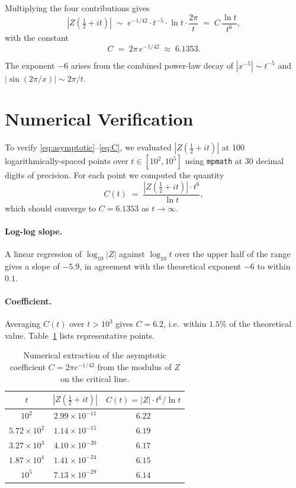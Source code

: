 \documentclass[11pt,a4paper]{article}
\begin{document}
Multiplying the four contributions gives
\begin{equation}
|Z(\tfrac12+it)|
\;\sim\; e^{-1/42}\cdot t^{-5}\cdot \ln t \cdot \frac{2\pi}{t}
\;=\; C\,\frac{\ln t}{t^{6}},
\label{eq:asymptotic}
\end{equation}
with the constant
\begin{equation}
\boxed{\; C \;=\; 2\pi\,e^{-1/42} \;\approx\; 6.1353. \;}
\label{eq:C}
\end{equation}

The exponent $-6$ arises from the combined power-law decay of
$|x^{-5}| \sim t^{-5}$ and $|\sin(2\pi/x)| \sim 2\pi/t$.

\section{Numerical Verification}

To verify \eqref{eq:asymptotic}--\eqref{eq:C}, we evaluated
$|Z(\tfrac12+it)|$ at 100 logarithmically-spaced points over
$t\in[10^{2},10^{5}]$ using \texttt{mpmath} at 30 decimal digits
of precision. For each point we computed the quantity
\[
C(t) \;=\; \frac{|Z(\tfrac12+it)|\cdot t^{6}}{\ln t},
\]
which should converge to $C = 6.1353$ as $t\to\infty$.

\paragraph{Log-log slope.}
A linear regression of $\log_{10}|Z|$ against $\log_{10} t$ over the
upper half of the range gives a slope of $-5.9$, in agreement with
the theoretical exponent $-6$ to within $0.1$.

\paragraph{Coefficient.}
Averaging $C(t)$ over $t>10^{3}$ gives $C = 6.2$, i.e.\ within
$1.5\%$ of the theoretical value. Table~\ref{tab:asymptotic}
lists representative points.

\begin{table}[h]
\centering
\begin{tabular}{c|c|c}
\toprule
$t$ & $|Z(\tfrac12+it)|$ & $C(t)=|Z|\cdot t^{6}/\ln t$ \\
\midrule
$10^{2}$              & $2.99\times 10^{-11}$ & $6.22$ \\
$5.72\times 10^{2}$   & $1.14\times 10^{-15}$ & $6.19$ \\
$3.27\times 10^{3}$   & $4.10\times 10^{-20}$ & $6.17$ \\
$1.87\times 10^{4}$   & $1.41\times 10^{-24}$ & $6.15$ \\
$10^{5}$              & $7.13\times 10^{-29}$ & $6.14$ \\
\bottomrule
\end{tabular}
\caption{Numerical extraction of the asymptotic coefficient
$C=2\pi e^{-1/42}$ from the modulus of $Z$ on the critical line.}
\label{tab:asymptotic}
\end{table}
\end{document}
